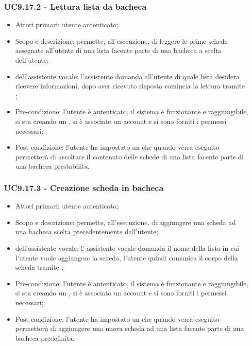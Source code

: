 \subsubsection{UC9.17.2 - Lettura lista da bacheca }
\begin{itemize}
	\item  Attori primari: utente autenticato;
	\item  Scopo e descrizione: permette, all'esecuzione, di leggere le prime schede assegnate all'utente di una lista facente parte di una bacheca a scelta dell'utente;
	\item  {} dell'assistente vocale: l'assistente domanda all'utente di quale lista desidera ricevere informazioni, dopo aver ricevuto risposta comincia la lettura tramite ;
	\item  Pre-condizione: l'utente è autenticato, il sistema è funzionante e raggiungibile, si sta creando un , si è associato un account  e si sono forniti i permessi necessari;
	\item  Post-condizione: l'utente ha impostato un  che quando verrà eseguito permetterà di ascoltare il contenuto delle schede di una lista facente parte di una bacheca prestabilita.
\end{itemize}
\subsubsection{UC9.17.3 - Creazione scheda in bacheca }
\begin{itemize}
	\item  Attori primari: utente autenticato;
	\item  Scopo e descrizione: permette, all'esecuzione, di aggiungere una scheda ad una bacheca scelta precedentemente dall'utente;
	\item  {} dell'assistente vocale: l' assistente vocale domanda il nome della lista in cui l'utente vuole aggiungere la scheda, l'utente quindi comunica il corpo della scheda tramite ;
	\item  Pre-condizione: l'utente è autenticato, il sistema è funzionante e raggiungibile, si sta creando un , si è associato un account  e si sono forniti i permessi necessari;
	\item  Post-condizione: l'utente ha impostato un  che quando verrà eseguito permetterà di aggiungere una nuova scheda ad una lista facente parte di una bacheca predefinita.
\end{itemize}
